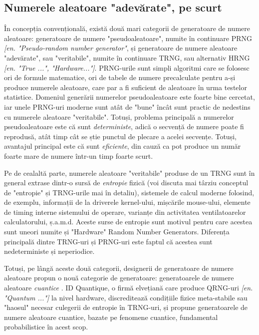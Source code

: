 \subsection{Numerele aleatoare "adevărate", pe scurt}
În concepția convențională, există două mari categorii de generatoare de numere aleatoare: generatoare de numere "pseudoaleatoare", numite în continuare PRNG \textit{[en. "Pseudo-random number generator"}, și generatoare de numere aleatoare "adevărate", sau "veritabile", numite în continuare TRNG, sau alternativ HRNG \textit{[en. "True ...", "Hardware..."]}. PRNG-urile sunt simpli algoritmi care se folosesc ori de formule matematice, ori de tabele de numere precalculate pentru a-și produce numerele aleatoare, care par a fi suficient de aleatoare în urma testelor statistice. Domeniul generării numerelor pseudoaleatoare este foarte bine cercetat, iar unele PRNG-uri moderne sunt atât de "bune" încât sunt practic de nedestins cu numerele aleatoare "veritabile". Totuși, problema principală a numerelor pseudoaleatoare este că sunt \textit{deterministe}, adică o secvență de numere poate fi reprodusă, atât timp cât se știe punctul de plecare a acelei secvențe. Totuși, avantajul principal este că sunt \textit{eficiente}, din cauză ca pot produce un număr foarte mare de numere într-un timp foarte scurt. 

Pe de cealaltă parte, numerele aleatoare "veritabile" produse de un TRNG sunt în general extrase dintr-o sursă de \textit{entropie} fizică (voi discuta mai târziu conceptul de "entropie" și TRNG-urile mai în detaliu), sistemele de calcul moderne folosind, de exemplu, informații de la driverele kernel-ului, mișcările mouse-ului, elemente de timing interne sistemului de operare, varianțe din activitatea ventilatoarelor calculatorului, ș.a.m.d. Aceste surse de entropie sunt motivul pentru care acestea sunt uneori numite și "Hardware" Random Number Generators. Diferența principală dintre TRNG-uri și PRNG-uri este faptul că acestea sunt nedeterministe și neperiodice. 

Totuși, pe lângă aceste două categorii, designerii de generatoare de numere aleatoare propun o nouă categorie de generatoare: generatoarele de numere aleatoare \textit{cuantice} \cite{IDQuantique:QuantumvsClassical}. ID Quantique, o firmă elvețiană care produce QRNG-uri \textit{[en. "Quantum ..."]} la nivel hardware, discreditează condițiile fizice meta-stabile sau "haosul" necesar culegerii de entropie în TRNG-uri, și propune generatoarele de numere aleatoare cuantice, bazate pe fenomene cuantice, fundamental probabilistice în acest scop.

